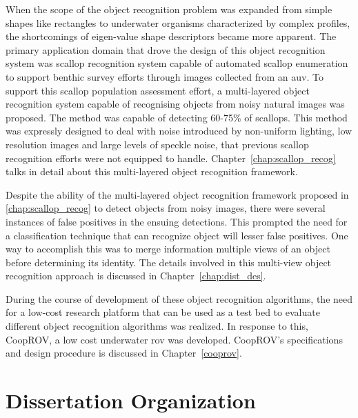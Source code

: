\documentclass {udthesis}
\begin{document}
When the scope of the object recognition problem was expanded from simple shapes like rectangles to underwater organisms characterized by complex profiles,
the shortcomings of eigen-value shape descriptors became more apparent. The primary application domain that drove the design of this object recognition system 
was scallop recognition system 
capable of automated scallop enumeration to support benthic survey efforts through images collected from an \gls{auv}. To support this 
scallop population assessment effort,
a multi-layered object recognition system capable of recognising objects from noisy natural images was proposed. The method was capable of detecting 60-75\% of scallops. This method was expressly designed to deal with noise introduced by non-uniform lighting, low resolution images and large levels of speckle noise, that previous scallop recognition efforts were not equipped to handle. Chapter~\ref{chap:scallop_recog} talks in detail about this multi-layered object recognition framework.

Despite the ability of the multi-layered object recognition framework proposed in \ref{chap:scallop_recog} to detect objects from noisy images, there were 
several instances of false positives in the ensuing detections. This prompted the need for a classification technique that can recognize object will lesser
false positives. One way to accomplish this was to merge information multiple views of an object before determining its identity. The details involved in this
multi-view object recognition approach is discussed in Chapter~\ref{chap:dist_des}.

During the course of development of these object recognition algorithms, the need for a low-cost research platform 
that can be used as a test bed to evaluate different object recognition algorithms was realized.
In response to this, CoopROV, a low cost underwater \gls{rov} was developed. CoopROV's specifications and 
design procedure is discussed in Chapter~\ref{cooprov}.

\section{Dissertation Organization}
\end{document}
